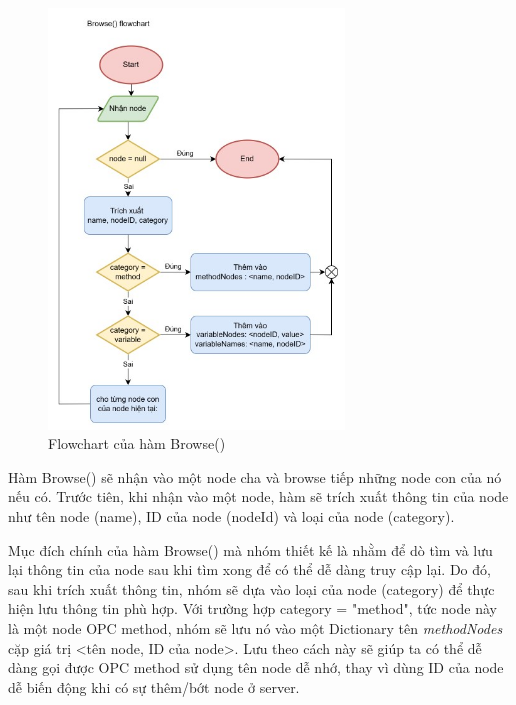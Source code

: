 \begin{figure}[H]
    \centering
    \includegraphics[width=0.7\textwidth]{Images/Implementation/VRapp/VR_browse_func.jpg}
    \caption{Flowchart của hàm Browse()}
    \label{fig:flow_browse}
\end{figure}

Hàm Browse() sẽ nhận vào một node cha và browse tiếp những node con của nó nếu có. Trước tiên, khi nhận vào một node, hàm sẽ trích xuất thông tin của node như tên node (name), ID của node (nodeId) và loại của node (category). 

Mục đích chính của hàm Browse() mà nhóm thiết kế là nhằm để dò tìm và lưu lại thông tin của node sau khi tìm xong để có thể dễ dàng truy cập lại. Do đó, sau khi trích xuất thông tin, nhóm sẽ dựa vào loại của node (category) để thực hiện lưu thông tin phù hợp. Với trường hợp category = "method", tức node này là một node OPC method, nhóm sẽ lưu nó vào một Dictionary tên \textit{methodNodes} cặp giá trị <tên node, ID của node>. Lưu theo cách này sẽ giúp ta có thể dễ dàng gọi được OPC method sử dụng tên node dễ nhớ, thay vì dùng ID của node dễ biến động khi có sự thêm/bớt node ở server. 

